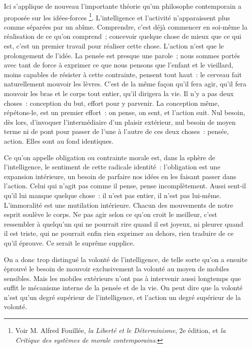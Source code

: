 \documentclass[french,twoside]{book} %
\begin{document}
Ici s’applique de nouveau l’importante théorie qu’un philosophe contemporain a proposée sur les idées-forces \footnote{Voir M. Alfred Fouillée, \emph{la Liberté et le Déterminisme}, 2e édition, et \emph{la Critique des systèmes de morale contemporains}.}. L’intelligence et l’activité n’apparaissent plus comme séparées par un abîme. Comprendre, c’est déjà commencer en soi-même la réalisation de ce qu’on comprend ; concevoir quelque chose de mieux que ce qui est, c’est un premier travail pour réaliser cette chose. L’action n’est que le prolongement de l’idée. La pensée est presque une parole ; nous sommes portés avec tant de force à exprimer ce que nous pensons que l’enfant et le vieillard, moins capables de résister à cette contrainte, pensent tout haut : le cerveau fait naturellement mouvoir les lèvres. C’est de la même façon qu’il fera agir, qu’il fera mouvoir les bras et le corps tout entier, qu’il dirigera la vie. Il n’y a pas deux choses : conception du but, effort pour y parvenir. La conception même, répétons-le, est un premier effort : on pense, on sent, et l’action suit. Nul besoin, dès lors, d’invoquer l’intermédiaire d’un plaisir extérieur, nul besoin de moyen terme ni de pont pour passer de l’une à l’autre de ces deux choses : pensée, action. Elles sont au fond identiques.\par
Ce qu’on appelle obligation ou contrainte morale est, dans la sphère de l’intelligence, le sentiment de cette radicale identité : l’obligation est une expansion intérieure, un besoin de parfaire nos idées en les faisant passer dans l’action. Celui qui n’agit pas comme il pense, pense incomplètement. Aussi sent-il qu’il lui manque quelque chose : il n’est pas entier, il n’est pas lui-même. L’immoralité est une mutilation intérieure. Chacun des mouvements de notre esprit soulève le corps. Ne pas agir selon ce qu’on croit le meilleur, c’est ressembler à quelqu’un qui ne pourrait rire quand il est joyeux, ni pleurer quand il est triste, qui ne pourrait enfin rien exprimer au dehors, rien traduire de ce qu’il éprouve. Ce serait le suprême supplice.\par
On a donc trop distingué la volonté de l’intelligence, de telle sorte qu’on a ensuite éprouvé le besoin de mouvoir exclusivement la volonté au moyen de mobiles sensibles. Mais les mobiles extérieurs n’ont pas à intervenir aussi longtemps que suffit le mécanisme interne de la pensée et de la vie. On peut dire que la volonté n’est qu’un degré supérieur de l’intelligence, et l’action un degré supérieur de la volonté.\par
\end{document}
